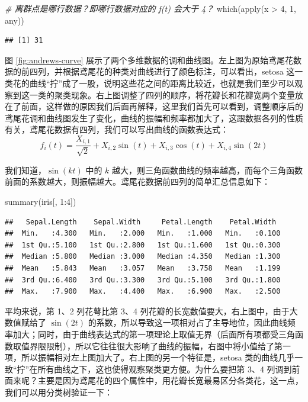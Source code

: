 \documentclass[
  b5paper,
  UTF8,twoside]{book}
\newenvironment{Shaded}{\begin{snugshade}}{\end{snugshade}}
\newcommand{\CommentTok}[1]{\textcolor[rgb]{0.56,0.35,0.01}{\textit{#1}}}
\newcommand{\DecValTok}[1]{\textcolor[rgb]{0.00,0.00,0.81}{#1}}
\newcommand{\FunctionTok}[1]{\textcolor[rgb]{0.00,0.00,0.00}{#1}}
\newcommand{\NormalTok}[1]{#1}
\newcommand{\SpecialCharTok}[1]{\textcolor[rgb]{0.00,0.00,0.00}{#1}}
\begin{document}
\begin{Shaded}
\begin{Highlighting}[]
\CommentTok{\# 离群点是哪行数据？即哪行数据对应的 f(t) 会大于 4？}
\FunctionTok{which}\NormalTok{(}\FunctionTok{apply}\NormalTok{(x }\SpecialCharTok{\textgreater{}} \DecValTok{4}\NormalTok{, }\DecValTok{1}\NormalTok{, any))}
\end{Highlighting}
\end{Shaded}

\begin{verbatim}
## [1] 31
\end{verbatim}

图 \ref{fig:andrews-curve}
展示了两个多维数据的调和曲线图。左上图为原始鸢尾花数据的前四列，并根据鸢尾花的种类对曲线进行了颜色标注，可以看出，setosa 这一类花的曲线``拧''成了一股，说明这些花之间的距离比较近，也就是我们至少可以观察到这一类的聚类现象。右上图调整了四列的顺序，将花瓣长和花瓣宽两个变量放在了前面，这样做的原因我们后面再解释，这里我们首先可以看到，调整顺序后的鸢尾花调和曲线图发生了变化，曲线的振幅和频率都加大了，这跟数据各列的性质有关，鸢尾花数据有四列，我们可以写出曲线的函数表达式：
\[f_{i}(t)=\frac{X_{i,1}}{\sqrt{2}}+X_{i,2}\sin(t)+X_{i,3}\cos(t)+X_{i,4}\sin(2t)\]

我们知道，\(\sin(kt)\) 中的 \(k\) 越大，则三角函数曲线的频率越高，而每个三角函数前面的系数越大，则振幅越大。鸢尾花数据前四列的简单汇总信息如下：

\begin{Shaded}
\begin{Highlighting}[]
\FunctionTok{summary}\NormalTok{(iris[, }\DecValTok{1}\SpecialCharTok{:}\DecValTok{4}\NormalTok{])}
\end{Highlighting}
\end{Shaded}

\begin{verbatim}
##   Sepal.Length    Sepal.Width     Petal.Length    Petal.Width   
##  Min.   :4.300   Min.   :2.000   Min.   :1.000   Min.   :0.100  
##  1st Qu.:5.100   1st Qu.:2.800   1st Qu.:1.600   1st Qu.:0.300  
##  Median :5.800   Median :3.000   Median :4.350   Median :1.300  
##  Mean   :5.843   Mean   :3.057   Mean   :3.758   Mean   :1.199  
##  3rd Qu.:6.400   3rd Qu.:3.300   3rd Qu.:5.100   3rd Qu.:1.800  
##  Max.   :7.900   Max.   :4.400   Max.   :6.900   Max.   :2.500
\end{verbatim}

平均来说，第 1、2 列花萼比第 3、4 列花瓣的长宽数值要大，右上图中，由于大数值赋给了 \(\sin(2t)\) 的系数，所以导致这一项相对占了主导地位，因此曲线频率加大；同时，由于曲线表达式的第一项理论上取值无界（后面所有项都受三角函数取值界限限制），所以它往往很大影响了曲线的振幅，右图中将小值给了第一项，所以振幅相对左上图加大了。右上图的另一个特征是，setosa 类的曲线几乎一致``拧''在所有曲线之下，这也使得观察聚类更方便。为什么要把第 3、4 列调到前面来呢？主要是因为鸢尾花的四个属性中，用花瓣长宽最易区分各类花，这一点，我们可以用分类树验证一下：
\end{document}
